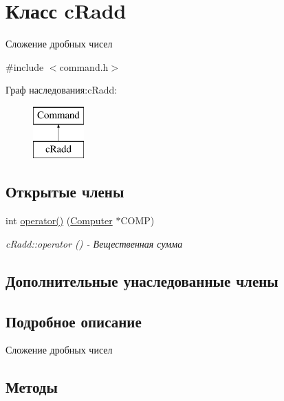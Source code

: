 \hypertarget{classc_radd}{}\section{Класс c\+Radd}
\label{classc_radd}


Сложение дробных чисел  




{\ttfamily \#include $<$command.\+h$>$}

Граф наследования\+:c\+Radd\+:\begin{figure}[H]
\begin{center}
\leavevmode
\includegraphics[height=2.000000cm]{classc_radd}
\end{center}
\end{figure}
\subsection*{Открытые члены}
\begin{DoxyCompactItemize}
\item 
int \hyperlink{classc_radd_a8a1aa83bf3a689bb0f547a9711b8b33a}{operator()} (\hyperlink{class_computer}{Computer} $\ast$C\+O\+MP)
\begin{DoxyCompactList}\small\item\em c\+Radd\+::operator () -\/ Вещественная сумма \end{DoxyCompactList}\end{DoxyCompactItemize}
\subsection*{Дополнительные унаследованные члены}


\subsection{Подробное описание}
Сложение дробных чисел 

\subsection{Методы}
\hypertarget{classc_radd_a8a1aa83bf3a689bb0f547a9711b8b33a}{}\label{classc_radd_a8a1aa83bf3a689bb0f547a9711b8b33a} 
